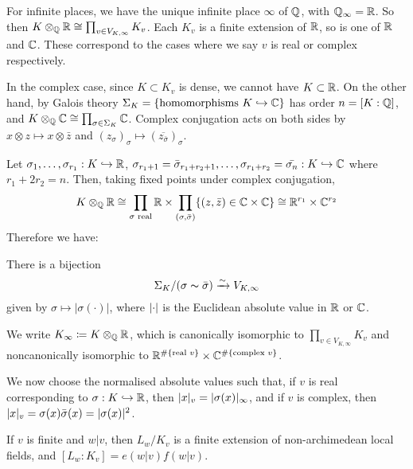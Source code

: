 \documentclass[10pt,a4paper]{article}
\begin{document}
For infinite places, we have the unique infinite place $\infty$ of $\mathbb{Q}$, with $\mathbb{Q}_\infty = \mathbb{R}$. So then $K \otimes_{\mathbb{Q}} \mathbb{R} \cong \prod_{v \in V_{K,\infty}} K_v$. Each $K_v$ is a finite extension of $\mathbb{R}$, so is one of $\mathbb{R}$ and $\mathbb{C}$. These correspond to the cases where we say $v$ is real or complex respectively.

In the complex case, since $K \subset K_v$ is dense, we cannot have $K \subset \mathbb{R}$. On the other hand, by Galois theory $\Sigma_K = \{\text{homomorphisms }K \hookrightarrow \mathbb{C}\}$ has order $n = [K:\mathbb{Q}]$, and $K \otimes_{\mathbb{Q}} \mathbb{C} \cong \prod_{\sigma \in \Sigma_K} \mathbb{C}$. Complex conjugation acts on both sides by $x \otimes z \mapsto x \otimes \bar{z}$ and $(z_\sigma)_\sigma \mapsto (\overline{z_{\bar{\sigma}}})_\sigma$.

Let $\sigma_1, \ldots, \sigma_{r_1} : K \hookrightarrow \mathbb{R}$, $\sigma_{r_1+1} = \bar{\sigma}_{r_1+r_2+1}, \ldots, \sigma_{r_1+r_2} = \bar{\sigma_n} : K \hookrightarrow \mathbb{C}$ where $r_1+2r_2 = n$. Then, taking fixed points under complex conjugation,
\[K \otimes_{\mathbb{Q}} \mathbb{R} \cong \prod_{\sigma \text{ real}} \mathbb{R} \times \prod_{(\sigma, \bar{\sigma})} \{(z,\bar{z}) \in \mathbb{C} \times \mathbb{C}\} \cong \mathbb{R}^{r_1}\times \mathbb{C}^{r_2}\]
Therefore we have:
\begin{theorem}
  There is a bijection
  \[\Sigma_K / (\sigma \thicksim \bar{\sigma}) \xrightarrow{\sim} V_{K,\infty}\]
  given by $\sigma \mapsto |\sigma(\cdot)|$, where $\lvert\cdot\rvert$ is the Euclidean absolute value in $\mathbb{R}$ or $\mathbb{C}$.
\end{theorem}
We write $K_\infty \coloneqq K \otimes_{\mathbb{Q}} \mathbb{R}$, which is canonically isomorphic to $\prod_{v \in V_{K, \infty}} K_v$ and noncanonically isomorphic to $\mathbb{R}^{\#\{\text{real }v\}}\times \mathbb{C}^{\#\{\text{complex }v\}}$.

We now choose the normalised absolute values such that, if $v$ is real corresponding to $\sigma:K \hookrightarrow \mathbb{R}$, then $\lvert x\rvert_v = \lvert\sigma(x)\rvert_\infty$, and if $v$ is complex, then $\lvert x\rvert_v = \sigma(x)\bar{\sigma}(x) = |\sigma(x)|^2$.

If $v$ is finite and $w|v$, then $L_w/K_v$ is a finite extension of non-archimedean local fields, and $[L_w:K_v] = e(w|v)f(w|v)$.
\end{document}
